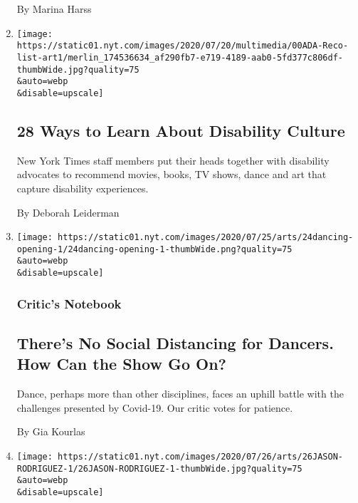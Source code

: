 \begin{enumerate}
  By Marina Harss
\item
  \href{/2020/07/24/arts/disability-movies-books-tv.html}{}

  \texttt{[image: https://static01.nyt.com/images/2020/07/20/multimedia/00ADA-Reco-list-art1/merlin\_174536634\_af290fb7-e719-4189-aab0-5fd377c806df-thumbWide.jpg?quality=75\\\&auto=webp\\\&disable=upscale]}

  \hypertarget{28-ways-to-learn-about-disability-culture}{%
  \subsection{28 Ways to Learn About Disability
  Culture}\label{28-ways-to-learn-about-disability-culture}}

  New York Times staff members put their heads together with disability
  advocates to recommend movies, books, TV shows, dance and art that
  capture disability experiences.

  By Deborah Leiderman
\item
  \href{/2020/07/24/arts/dance/safety-protocols-dance-coronavirus.html}{}

  \texttt{[image: https://static01.nyt.com/images/2020/07/25/arts/24dancing-opening-1/24dancing-opening-1-thumbWide.png?quality=75\\\&auto=webp\\\&disable=upscale]}

  \hypertarget{critics-notebook-1}{%
  \subsubsection{Critic's Notebook}\label{critics-notebook-1}}

  \hypertarget{theres-no-social-distancing-for-dancers-how-can-the-show-go-on}{%
  \subsection{There's No Social Distancing for Dancers. How Can the Show
  Go
  On?}\label{theres-no-social-distancing-for-dancers-how-can-the-show-go-on}}

  Dance, perhaps more than other disciplines, faces an uphill battle
  with the challenges presented by Covid-19. Our critic votes for
  patience.

  By Gia Kourlas
\item
  \href{/2020/07/24/arts/dance/jason-rodriguez-vogue-pose.html}{}

  \texttt{[image: https://static01.nyt.com/images/2020/07/26/arts/26JASON-RODRIGUEZ-1/26JASON-RODRIGUEZ-1-thumbWide.jpg?quality=75\\\&auto=webp\\\&disable=upscale]}


\end{enumerate}
